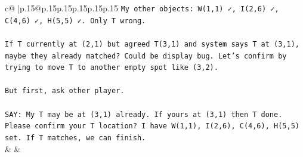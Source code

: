 \documentclass{article}
\begin{document}
{\begin{supertabular}{c@{$\;$}|p{.15\linewidth}@{}p{.15\linewidth}p{.15\linewidth}p{.15\linewidth}p{.15\linewidth}p{.15\linewidth}}
{{{\texttt{My other objects: W(1,1) ✓, I(2,6) ✓, C(4,6) ✓, H(5,5) ✓. Only T wrong.} \\
\\ 
\texttt{If T currently at (2,1) but agreed T(3,1) and system says T at (3,1), maybe they already matched? Could be display bug. Let’s confirm by trying to move T to another empty spot like (3,2).} \\
\\ 
\texttt{But first, ask other player.} \\
\\ 
\texttt{SAY: My T may be at (3,1) already. If yours at (3,1) then T done. Please confirm your T location? I have W(1,1), I(2,6), C(4,6), H(5,5) set. If T matches, we can finish.} \\
            }
        }
    }
    & & \\ \\


\end{supertabular}}
\end{document}
